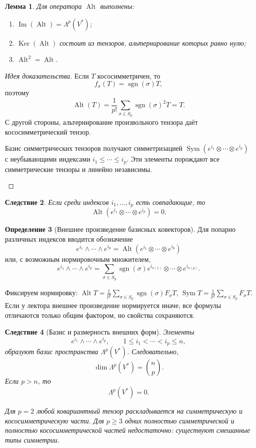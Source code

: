 \documentclass[12pt,a4paper]{article}
\theoremstyle{definition}
\newtheorem{definition}{Определение}[section]
\theoremstyle{plain}
\newtheorem{lemma}[definition]{Лемма}
\newtheorem{corollary}[definition]{Следствие}
\theoremstyle{remark}
\newenvironment{knowledgefix}{\begin{clarifybox}}{\end{clarifybox}}
\newcommand{\Ker}{\operatorname{Ker}}
\newcommand{\Imop}{\operatorname{Im}}
\newcommand{\Sym}{\operatorname{Sym}}
\newcommand{\Alt}{\operatorname{Alt}}
\providecommand{\sgn}{\operatorname{sgn}}
\begin{document}
\begin{lemma}
Для оператора $\Alt$ выполнены:
\begin{enumerate}[label=\arabic*)]
    \item $\Imop(\Alt)=\Lambda^p(V^*)$;
    \item $\Ker(\Alt)$ состоит из тензоров, альтернирование которых равно нулю;
    \item $\Alt^2=\Alt$.
\end{enumerate}
\end{lemma}

\begin{proof}[Идея доказательства]
Если $T$ кососимметричен, то
\[
    f_\sigma(T)=\sgn(\sigma)T,
\]
поэтому
\[
    \Alt(T)=\frac{1}{p!}\sum_{\sigma\in S_p}\sgn(\sigma)^2T=T.
\]
С другой стороны, альтернирование произвольного тензора даёт кососимметрический тензор.
\begin{knowledgefix}
Базис симметрических тензоров получают симметризацией \(\Sym(e^{i_1}\otimes\cdots\otimes e^{i_p})\) с неубывающими индексами \(i_1\le\cdots\le i_p\). Эти элементы порождают все симметрические тензоры и линейно независимы.
\end{knowledgefix}
\end{proof}

\begin{corollary}
Если среди индексов $i_1,\ldots,i_p$ есть совпадающие, то
\[
    \Alt(e^{i_1}\otimes\cdots\otimes e^{i_p})=0.
\]
\end{corollary}

\begin{definition}[Внешнее произведение базисных ковекторов]
Для попарно различных индексов вводится обозначение
\[
    e^{i_1}\wedge\cdots\wedge e^{i_p}
    =
    \Alt(e^{i_1}\otimes\cdots\otimes e^{i_p})
\]
или, с возможным нормировочным множителем,
\[
    e^{i_1}\wedge\cdots\wedge e^{i_p}
    =
    \sum_{\sigma\in S_p}\sgn(\sigma)
    e^{i_{\sigma(1)}}\otimes\cdots\otimes e^{i_{\sigma(p)}}.
\]
\begin{knowledgefix}
Фиксируем нормировку: \(\Alt T=\frac1{p!}\sum_{\sigma\in S_p}\sgn(\sigma)F_\sigma T\), \(\Sym T=\frac1{p!}\sum_{\sigma\in S_p}F_\sigma T\). Если у лектора внешнее произведение нормируется иначе, все формулы отличаются только общим фактором, но свойства сохраняются.
\end{knowledgefix}
\end{definition}

\begin{corollary}[Базис и размерность внешних форм]
Элементы
\[
    e^{i_1}\wedge\cdots\wedge e^{i_p},
    \qquad
    1\le i_1<\cdots<i_p\le n,
\]
образуют базис пространства $\Lambda^p(V^*)$.
Следовательно,
\[
    \dim \Lambda^p(V^*)=\binom{n}{p}.
\]
Если $p>n$, то
\[
    \Lambda^p(V^*)=0.
\]
\begin{knowledgefix}
Для \(p=2\) любой ковариантный тензор раскладывается на симметрическую и кососимметрическую части. Для \(p\ge3\) одних полностью симметрической и полностью кососимметрической частей недостаточно: существуют смешанные типы симметрии.
\end{knowledgefix}
\end{corollary}
\end{document}

